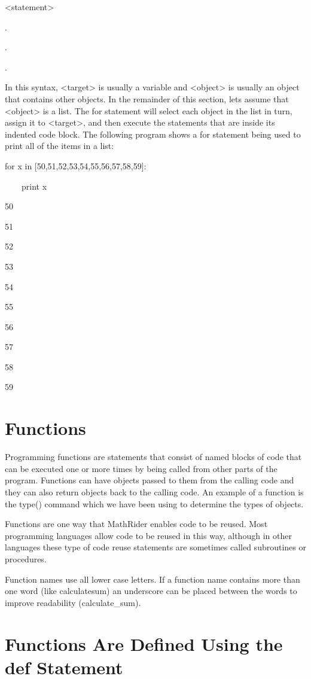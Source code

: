 \documentclass[12pt,oneside]{book}
\begin{document}
 {\textless}statement{\textgreater}

.

.

.


In this syntax, {\textless}target{\textgreater} is usually a variable and {\textless}object{\textgreater} is usually an object that contains other objects. In the remainder of this section, lets assume that {\textless}object{\textgreater} is a list. The for statement will select each object in the list in turn, assign it to {\textless}target{\textgreater}, and then execute the statements that are inside its indented code block. The following program shows a for statement being used to print all of the items in a list: 

for x in [50,51,52,53,54,55,56,57,58,59]:

\ \ \ \ print x

{\textbar}

50

51

52

53

54

55

56

57

58

59

\section[Functions]{Functions}

Programming functions are statements that consist of named blocks of code that can be executed one or more times by being called from other parts of the program. Functions can have objects passed to them from the calling code and they can also return objects back to the calling code. An example of a function is the type() command which we have been using to determine the types of objects. 

Functions are one way that MathRider enables code to be reused. Most programming languages allow code to be reused in this way, although in other languages these type of code reuse statements are sometimes called subroutines or procedures. 

Function names use all lower case letters. If a function name contains more than one word (like calculatesum) an underscore can be placed between the words to improve readability (calculate\_sum).

\section[Functions Are Defined Using the def Statement]{Functions Are Defined Using the def Statement}
\end{document}
